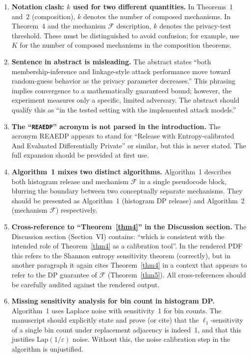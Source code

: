 \documentclass[12pt]{article}
\begin{document}
\begin{enumerate}[label=\textbf{m\arabic*.}, leftmargin=*, wide=0pt]

\item \textbf{Notation clash: $k$ used for two different quantities.}
In Theorems~1 and~2 (composition), $k$ denotes the number of composed mechanisms. In Theorem~4 and the mechanism $\mathcal{F}$ description, $k$ denotes the privacy-test threshold. These must be distinguished to avoid confusion; for example, use $K$ for the number of composed mechanisms in the composition theorems.

\item \textbf{Sentence in abstract is misleading.}
The abstract states ``both membership-inference and linkage-style attack performance move toward random-guess behavior as the privacy parameter decreases.'' This phrasing implies convergence to a mathematically guaranteed bound; however, the experiment measures only a specific, limited adversary. The abstract should qualify this as ``in the tested setting with the implemented attack models.''

\item \textbf{The ``\texttt{REAEDP}'' acronym is not parsed in the introduction.}
The acronym REAEDP appears to stand for ``Release with Entropy-calibrated And Evaluated Differentially Private'' or similar, but this is never stated. The full expansion should be provided at first use.

\item \textbf{Algorithm~1 mixes two distinct algorithms.}
Algorithm~1 describes both histogram release and mechanism $\mathcal{F}$ in a single pseudocode block, blurring the boundary between two conceptually separate mechanisms. They should be presented as Algorithm~1 (histogram DP release) and Algorithm~2 (mechanism $\mathcal{F}$) respectively.

\item \textbf{Cross-reference to ``Theorem~\ref{thm4}'' in the Discussion section.}
The Discussion section (Section~VI) contains: ``which is consistent with the intended role of Theorem~\ref{thm4} as a calibration tool''. In the rendered PDF this refers to the Shannon entropy sensitivity theorem (correctly), but in another paragraph it again cites Theorem~\ref{thm4} in a context that appears to refer to the DP guarantee of $\mathcal{F}$ (Theorem~\ref{thm5}). All cross-references should be carefully audited against the rendered output.

\item \textbf{Missing sensitivity analysis for bin count in histogram DP.}
Algorithm~1 uses Laplace noise with sensitivity~1 for bin counts. The manuscript should explicitly state and prove (or cite) that the $\ell_1$-sensitivity of a single bin count under replacement adjacency is indeed~1, and that this justifies $\mathrm{Lap}(1/\varepsilon)$ noise. Without this, the noise calibration step in the algorithm is unjustified.


\end{enumerate}
\end{document}
